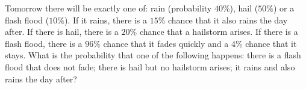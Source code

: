 Tomorrow there will be exactly one of: rain (probability $40\%$), hail ($50\%$) or a flash flood ($10\%$). If it rains, there is a $15\%$ chance that it also rains the day after. If there is hail, there is a $20\%$ chance that a hailstorm arises. If there is a flash flood, there is a $96\%$ chance that it fades quickly and a $4\%$ chance that it stays. What is the probability that one of the following happens: there is a flash flood that does not fade; there is hail but no hailstorm arises; it rains and also rains the day after?
